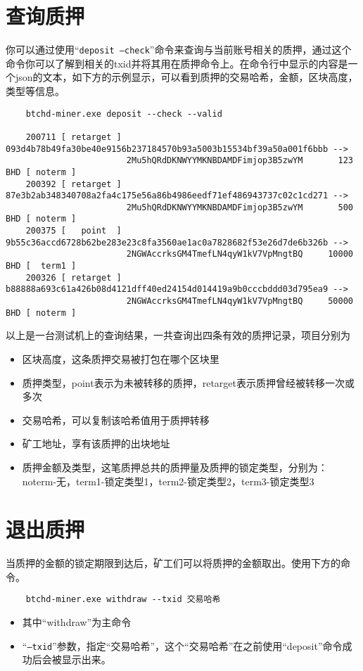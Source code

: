 \section{查询质押}
\begin{flushleft}
    你可以通过使用``\texttt{deposit --check}''命令来查询与当前账号相关的质押，通过这个命令你可以了解到相关的txid并将其用在质押命令上。在命令行中显示的内容是一个json的文本，如下方的示例显示，可以看到质押的交易哈希，金额，区块高度，类型等信息。
\end{flushleft}
\scriptsize
\begin{verbatim}
    btchd-miner.exe deposit --check --valid

    200711 [ retarget ] 093d4b78b49fa30be40e9156b237184570b93a5003b15534bf39a50a001f6bbb -->
                        2Mu5hQRdDKNWYYMKNBDAMDFimjop3B5zwYM       123 BHD [ noterm ]
    200392 [ retarget ] 87e3b2ab348340708a2fa4c175e56a86b4986eedf71ef486943737c02c1cd271 -->
                        2Mu5hQRdDKNWYYMKNBDAMDFimjop3B5zwYM       500 BHD [ noterm ]
    200375 [   point  ] 9b55c36accd6728b62be283e23c8fa3560ae1ac0a7828682f53e26d7de6b326b -->
                        2NGWAccrksGM4TmefLN4qyW1kV7VpMngtBQ     10000 BHD [  term1 ]
    200326 [ retarget ] b88888a693c61a426b08d4121dff40ed24154d014419a9b0cccbddd03d795ea9 -->
                        2NGWAccrksGM4TmefLN4qyW1kV7VpMngtBQ     50000 BHD [ noterm ]
\end{verbatim}
\normalsize
\begin{flushleft}
    以上是一台测试机上的查询结果，一共查询出四条有效的质押记录，项目分别为
\end{flushleft}
\begin{itemize}
    \item 区块高度，这条质押交易被打包在哪个区块里
    \item 质押类型，point表示为未被转移的质押，retarget表示质押曾经被转移一次或多次
    \item 交易哈希，可以复制该哈希值用于质押转移
    \item 矿工地址，享有该质押的出块地址
    \item 质押金额及类型，这笔质押总共的质押量及质押的锁定类型，分别为：noterm-无，term1-锁定类型1，term2-锁定类型2，term3-锁定类型3
\end{itemize}
\section{退出质押}
\begin{flushleft}
    当质押的金额的锁定期限到达后，矿工们可以将质押的金额取出。使用下方的命令。
\end{flushleft}
\scriptsize
\begin{verbatim}
    btchd-miner.exe withdraw --txid 交易哈希
\end{verbatim}
\normalsize
\begin{itemize}
    \item 其中``withdraw''为主命令
    \item ``\texttt{--txid}''参数，指定``交易哈希''，这个``交易哈希''在之前使用``deposit''命令成功后会被显示出来。
\end{itemize}
